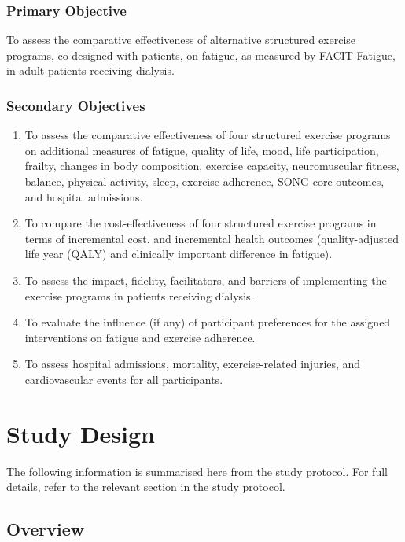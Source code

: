 \documentclass[11pt,parskip=half-]{scrartcl}
\begin{document}
\subsubsection{Primary Objective}
\label{primary-objective}

To assess the comparative effectiveness of alternative structured exercise programs, co-designed with patients, on fatigue, as measured by FACIT-Fatigue, in adult patients receiving dialysis.

\subsubsection{Secondary Objectives}
\label{secondary-objectives}

\begin{enumerate}
  \def\labelenumi{\arabic{enumi}.}
  \item To assess the comparative effectiveness of four structured exercise programs on additional measures of fatigue, quality of life, mood, life participation, frailty, changes in body composition, exercise capacity, neuromuscular fitness, balance, physical activity, sleep, exercise adherence, SONG core outcomes, and hospital admissions.
  \item To compare the cost-effectiveness of four structured exercise programs in terms of incremental cost, and incremental health outcomes (quality-adjusted life year (QALY) and clinically important difference in fatigue).
  \item To assess the impact, fidelity, facilitators, and barriers of implementing the exercise programs in patients receiving dialysis.
  \item To evaluate the influence (if any) of participant preferences for the assigned interventions on fatigue and exercise adherence.
  \item To assess hospital admissions, mortality, exercise-related injuries, and cardiovascular events for all participants.
\end{enumerate}

\clearpage

\section{Study Design}\label{study-design}

The following information is summarised here from the study protocol. For full details, refer to the relevant section in the study protocol.

\subsection{Overview}\label{overview}
\end{document}
